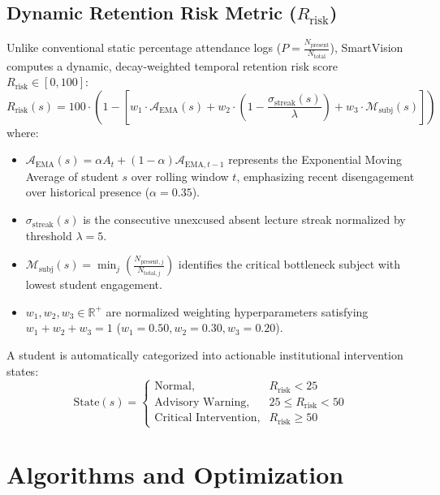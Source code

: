 \documentclass[conference]{IEEEtran}
\begin{document}
\subsection{Dynamic Retention Risk Metric ($R_{\text{risk}}$)}
Unlike conventional static percentage attendance logs ($P = \frac{N_{\text{present}}}{N_{\text{total}}}$), SmartVision computes a dynamic, decay-weighted temporal retention risk score $R_{\text{risk}} \in [0, 100]$:
\begin{equation}
R_{\text{risk}}(s) = 100 \cdot \left( 1 - \left[ w_1 \cdot \mathcal{A}_{\text{EMA}}(s) + w_2 \cdot \left(1 - \frac{\sigma_{\text{streak}}(s)}{\lambda}\right) + w_3 \cdot \mathcal{M}_{\text{subj}}(s) \right] \right)
\end{equation}
where:
\begin{itemize}
    \item $\mathcal{A}_{\text{EMA}}(s) = \alpha A_t + (1-\alpha)\mathcal{A}_{\text{EMA}, t-1}$ represents the Exponential Moving Average of student $s$ over rolling window $t$, emphasizing recent disengagement over historical presence ($\alpha = 0.35$).
    \item $\sigma_{\text{streak}}(s)$ is the consecutive unexcused absent lecture streak normalized by threshold $\lambda = 5$.
    \item $\mathcal{M}_{\text{subj}}(s) = \min_{j} \left(\frac{N_{\text{present}, j}}{N_{\text{total}, j}}\right)$ identifies the critical bottleneck subject with lowest student engagement.
    \item $w_1, w_2, w_3 \in \mathbb{R}^+$ are normalized weighting hyperparameters satisfying $w_1 + w_2 + w_3 = 1$ ($w_1 = 0.50, w_2 = 0.30, w_3 = 0.20$).
\end{itemize}

A student is automatically categorized into actionable institutional intervention states:
\begin{equation}
\text{State}(s) = 
\begin{cases}
\text{Normal}, & R_{\text{risk}} < 25 \\
\text{Advisory Warning}, & 25 \le R_{\text{risk}} < 50 \\
\text{Critical Intervention}, & R_{\text{risk}} \ge 50
\end{cases}
\end{equation}

\section{Algorithms and Optimization}
\end{document}
